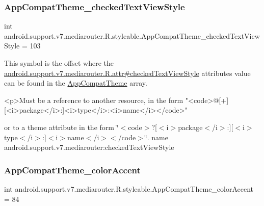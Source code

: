\subsubsection{\texorpdfstring{App\+Compat\+Theme\+\_\+checked\+Text\+View\+Style}{AppCompatTheme\_checkedTextViewStyle}}
{\footnotesize\ttfamily int android.\+support.\+v7.\+mediarouter.\+R.\+styleable.\+App\+Compat\+Theme\+\_\+checked\+Text\+View\+Style = 103\hspace{0.3cm}{\ttfamily [static]}}

This symbol is the offset where the \hyperlink{classandroid_1_1support_1_1v7_1_1mediarouter_1_1R_1_1attr_a81e21989621264b9fcc0a28388fa3fa2}{android.\+support.\+v7.\+mediarouter.\+R.\+attr\#checked\+Text\+View\+Style} attribute\textquotesingle{}s value can be found in the \hyperlink{classandroid_1_1support_1_1v7_1_1mediarouter_1_1R_1_1styleable_a4e3d3900c75d49aeb2f283cac00214d6}{App\+Compat\+Theme} array.

\begin{DoxyVerb}      <p>Must be a reference to another resource, in the form "<code>@[+][<i>package</i>:]<i>type</i>:<i>name</i></code>"
\end{DoxyVerb}
 or to a theme attribute in the form \char`\"{}$<$code$>$?\mbox{[}$<$i$>$package$<$/i$>$\+:\mbox{]}\mbox{[}$<$i$>$type$<$/i$>$\+:\mbox{]}$<$i$>$name$<$/i$>$$<$/code$>$\char`\"{}.  name android.\+support.\+v7.\+mediarouter\+:checked\+Text\+View\+Style \mbox{\label{classandroid_1_1support_1_1v7_1_1mediarouter_1_1R_1_1styleable_a8579a8f66a19549046fe28ca6a0b001b}} 
\subsubsection{\texorpdfstring{App\+Compat\+Theme\+\_\+color\+Accent}{AppCompatTheme\_colorAccent}}
{\footnotesize\ttfamily int android.\+support.\+v7.\+mediarouter.\+R.\+styleable.\+App\+Compat\+Theme\+\_\+color\+Accent = 84\hspace{0.3cm}{\ttfamily [static]}}

